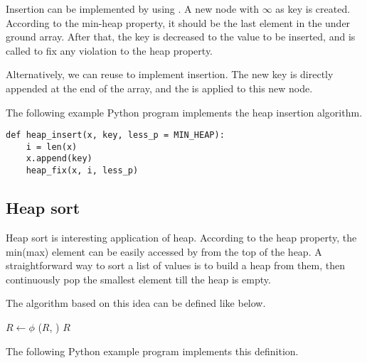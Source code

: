 \documentclass{article}
\begin{document}
Insertion can be implemented by using  \cite{CLRS}.
A new node with $\infty$ as key is created. According
to the min-heap property, it should be the last element
in the under ground array. After that, the key is decreased to
the value to be inserted, and  is called
to fix any violation to the heap property.

Alternatively, we can reuse  to implement
insertion. The new key is directly appended at the end of the array,
and the  is applied to this new node.

\begin{algorithmic}[1]
  \State {}
  \State {}
\EndFunction
\end{algorithmic}

The following example Python program implements the heap insertion
algorithm.

\lstset{language=Python}
\begin{lstlisting}
def heap_insert(x, key, less_p = MIN_HEAP):
    i = len(x)
    x.append(key)
    heap_fix(x, i, less_p)
\end{lstlisting}

\subsection{Heap sort}
\label{heap-sort}

Heap sort is interesting application of heap. According
to the heap property, the min(max) element can be easily accessed
by from the top of the heap. A straightforward way to sort a list
of values is to build a heap from them, then continuously
pop the smallest element till the heap is empty.

The algorithm based on this idea can be defined like below.

\begin{algorithmic}[1]
  \State $R \gets \phi$
  \State {}
    \State {}($R$, )
  \EndWhile
  \State \Return $R$
\EndFunction
\end{algorithmic}

The following Python example program implements this definition.
\end{document}
